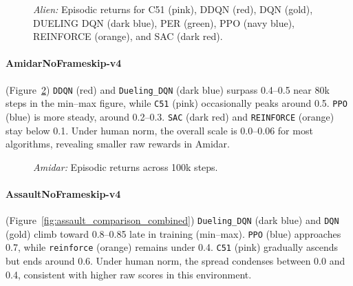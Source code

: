 \begin{figure} 
	\centering
	\quad
	\caption{\emph{Alien:} Episodic returns for C51 (pink), DDQN (red), 
		DQN (gold), DUELING DQN (dark blue), PER (green),
		PPO (navy blue), REINFORCE (orange), and SAC (dark red).}
	\label{fig:alien_comparison_combined}
\end{figure}

\paragraph{AmidarNoFrameskip-v4}
(Figure~\ref{fig:amidar_comparison_combined})
\texttt{DDQN} (red) and \texttt{Dueling\_DQN} (dark blue) surpass 0.4--0.5 near 80k steps 
in the min--max figure, while \texttt{C51} (pink) occasionally peaks around 0.5. 
\texttt{PPO} (blue) is more steady, around 0.2--0.3. \texttt{SAC} (dark red) 
and \texttt{REINFORCE} (orange) stay below 0.1. 
Under human norm, the overall scale is 0.0--0.06 for most algorithms, 
revealing smaller raw rewards in Amidar.

\begin{figure} 
	\centering
	\quad
	\caption{\emph{Amidar:} Episodic returns across 100k steps.}
	\label{fig:amidar_comparison_combined}
\end{figure}

\paragraph{AssaultNoFrameskip-v4}
(Figure~\ref{fig:assault_comparison_combined})
\texttt{Dueling\_DQN} (dark blue) and \texttt{DQN} (gold) climb toward 0.8--0.85 
late in training (min--max). 
\texttt{PPO} (blue) approaches 0.7, while \texttt{reinforce} (orange) remains 
under 0.4. \texttt{C51} (pink) gradually ascends but ends around 0.6. 
Under human norm, the spread condenses between 0.0 and 0.4, consistent with higher 
raw scores in this environment.

